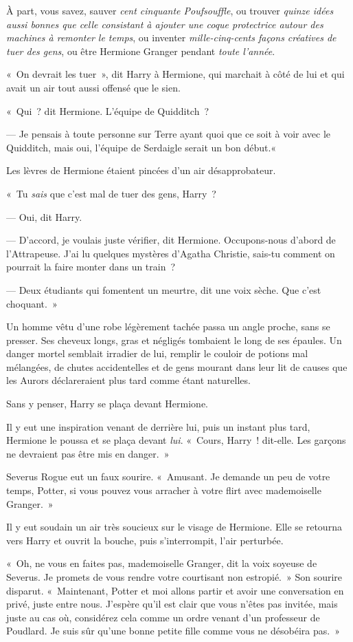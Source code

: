 À part, vous savez, sauver \emph{cent cinquante Poufsouffle}, ou trouver \emph{quinze idées aussi bonnes que celle consistant à ajouter une coque protectrice autour des machines à remonter le temps}, ou inventer \emph{mille-cinq-cents façons créatives de tuer des gens}, ou être Hermione Granger pendant \emph{toute l'année}.

«~On devrait les tuer~», dit Harry à Hermione, qui marchait à côté de lui et qui avait un air tout aussi offensé que le sien.

«~Qui~? dit Hermione. L'équipe de Quidditch~?

--- Je pensais à toute personne sur Terre ayant quoi que ce soit à voir avec le Quidditch, mais oui, l'équipe de Serdaigle serait un bon début.«~

Les lèvres de Hermione étaient pincées d'un air désapprobateur.

«~Tu \emph{sais} que c'est mal de tuer des gens, Harry~?

--- Oui, dit Harry.

--- D'accord, je voulais juste vérifier, dit Hermione. Occupons-nous d'abord de l'Attrapeuse. J'ai lu quelques mystères d'Agatha Christie, sais-tu comment on pourrait la faire monter dans un train~?

--- Deux étudiants qui fomentent un meurtre, dit une voix sèche. Que c'est choquant.~»

Un homme vêtu d’une robe légèrement tachée passa un angle proche, sans se presser. Ses cheveux longs, gras et négligés tombaient le long de ses épaules. Un danger mortel semblait irradier de lui, remplir le couloir de potions mal mélangées, de chutes accidentelles et de gens mourant dans leur lit de causes que les Aurors déclareraient plus tard comme étant naturelles.

Sans y penser, Harry se plaça devant Hermione.

Il y eut une inspiration venant de derrière lui, puis un instant plus tard, Hermione le poussa et se plaça devant \emph{lui}. «~Cours, Harry~! dit-elle. Les garçons ne devraient pas être mis en danger.~»

Severus Rogue eut un faux sourire. «~Amusant. Je demande un peu de votre temps, Potter, si vous pouvez vous arracher à votre flirt avec mademoiselle Granger.~»

Il y eut soudain un air très soucieux sur le visage de Hermione. Elle se retourna vers Harry et ouvrit la bouche, puis s'interrompit, l'air perturbée.

«~Oh, ne vous en faites pas, mademoiselle Granger, dit la voix soyeuse de Severus. Je promets de vous rendre votre courtisant non estropié.~» Son sourire disparut. «~Maintenant, Potter et moi allons partir et avoir une conversation en privé, juste entre nous. J'espère qu'il est clair que vous n'êtes pas invitée, mais juste au cas où, considérez cela comme un ordre venant d'un professeur de Poudlard. Je suis sûr qu'une bonne petite fille comme vous ne désobéira pas.~»

